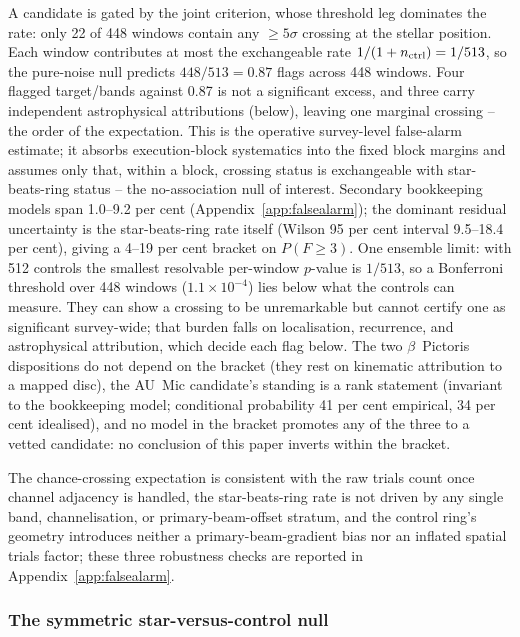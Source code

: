 \documentclass{openjournal}
\begin{document}
A candidate is gated by the joint criterion, whose threshold leg
dominates the rate: only 22 of 448 windows contain any $\geq5\sigma$
crossing at the stellar position. Each window contributes at most the
exchangeable rate $1/(1+n_{\rm ctrl})=1/513$, so the pure-noise null
predicts $448/513=0.87$ flags across 448 windows. Four flagged
target/bands against 0.87 is not a significant excess, and three
carry independent astrophysical attributions (below), leaving one
marginal crossing -- the order of the expectation. This is the
operative survey-level false-alarm estimate; it absorbs
execution-block systematics into the fixed block margins and assumes
only that, within a block, crossing status is exchangeable with
star-beats-ring status -- the no-association null of interest.
Secondary bookkeeping models span 1.0--9.2 per cent
(Appendix~\ref{app:falsealarm}); the dominant residual uncertainty is
the star-beats-ring rate itself (Wilson 95 per cent interval
9.5--18.4 per cent), giving a 4--19 per cent bracket on $P(F\geq3)$.
One ensemble limit: with 512 controls the smallest resolvable
per-window $p$-value is $1/513$, so a Bonferroni threshold over 448
windows ($1.1\times10^{-4}$) lies below what the controls can
measure. They can show a crossing to be unremarkable but cannot
certify one as significant survey-wide; that burden falls on
localisation, recurrence, and astrophysical attribution, which decide
each flag below. The two $\beta$~Pictoris dispositions do not depend
on the bracket (they rest on kinematic attribution to a mapped disc),
the AU~Mic candidate's standing is a rank statement (invariant to the
bookkeeping model; conditional probability 41 per cent empirical, 34
per cent idealised), and no model in the bracket promotes any of the
three to a vetted candidate: no conclusion of this paper inverts
within the bracket.

The chance-crossing expectation is consistent with the raw trials
count once channel adjacency is handled, the star-beats-ring rate is
not driven by any single band, channelisation, or primary-beam-offset
stratum, and the control ring's geometry introduces neither a
primary-beam-gradient bias nor an inflated spatial trials factor;
these three robustness checks are reported in
Appendix~\ref{app:falsealarm}.

\subsubsection*{The symmetric star-versus-control null}
\end{document}

